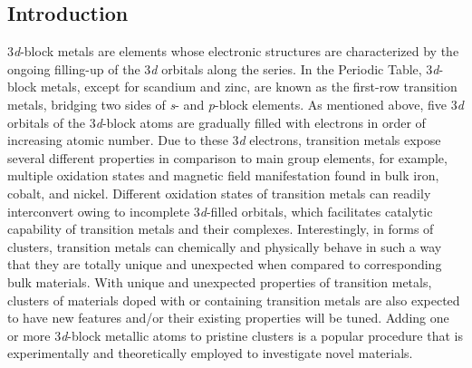 
\begin{refsection}

\chapter{Introduction}\label{ch:introduction}



3\textit{d}-block metals are elements whose electronic structures are characterized by the ongoing filling-up of the 3\textit{d} orbitals along the series. In the Periodic Table, 3\textit{d}-block metals,  except for scandium and zinc, are known as the first-row transition metals, bridging two sides of \textit{s}- and \textit{p}-block elements. As mentioned above, five 3\textit{d} orbitals of the 3\textit{d}-block atoms are gradually filled with electrons in order of increasing atomic number. Due to these 3\textit{d} electrons, transition metals expose several different properties in comparison to main group elements, for example, multiple oxidation states and magnetic field manifestation found in bulk iron, cobalt, and nickel. Different oxidation states of transition metals can readily interconvert owing to incomplete 3\textit{d}-filled orbitals, which facilitates catalytic capability of transition metals and their complexes. \cite{c1:1, c1:2, c1:3, c1:4} Interestingly, in forms of clusters, transition metals can chemically and physically behave in such a way that they are totally unique and unexpected when compared to corresponding bulk materials. With unique and unexpected properties of transition metals, clusters of materials doped with or containing transition metals are also expected to have new features and/or their existing properties will be tuned. Adding one or more 3\textit{d}-block metallic atoms to pristine clusters is a popular procedure that is experimentally and theoretically employed to investigate novel materials. 




\end{refsection}
